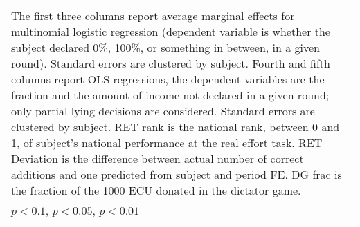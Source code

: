 \begin{tabular}{l|cccccc|cc|cc}
\hline\hline
\multicolumn{11}{p{18cm}}{\tiny The first three columns report average marginal effects for multinomial logistic regression (dependent variable is whether the subject declared 0\%, 100\%, or something in between, in a given round). Standard errors are clustered by subject. Fourth and fifth columns report OLS regressions, the dependent variables are the fraction and the amount of income not declared in a given round; only partial lying decisions are considered. Standard errors are clustered by subject. RET rank is the national rank, between 0 and 1, of subject's national performance at the real effort task. RET Deviation is the difference between actual number of correct additions and one predicted from subject and period FE. DG frac is the fraction of the 1000 ECU donated in the dictator game.}\\
\multicolumn{11}{l}{\tiny \sym{*} \(p<0.1\), \sym{**} \(p<0.05\), \sym{***} \(p<0.01\)}\\
\end{tabular}